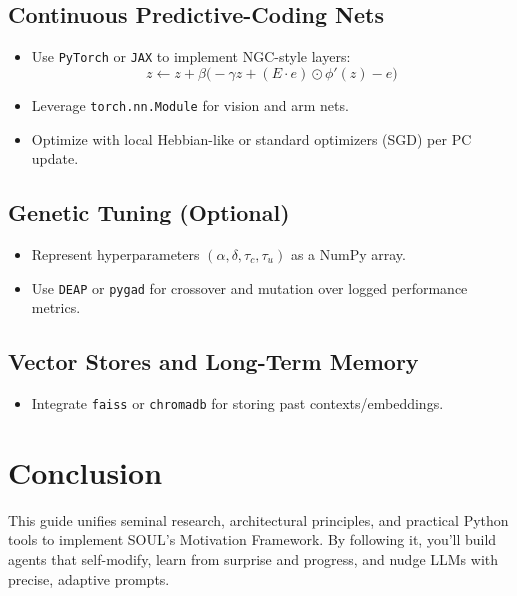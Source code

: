 \documentclass[11pt]{article}
\begin{document}
\subsection{Continuous Predictive-Coding Nets}
\begin{itemize}
  \item Use \texttt{PyTorch} or \texttt{JAX} to implement NGC-style layers:
  \[
    z \leftarrow z + \beta\bigl(-\gamma z + (E\cdot e)\odot \phi'(z) - e\bigr)
  \]
  \item Leverage \texttt{torch.nn.Module} for vision and arm nets.
  \item Optimize with local Hebbian-like or standard optimizers (SGD) per PC update.
\end{itemize}

\subsection{Genetic Tuning (Optional)}
\begin{itemize}
  \item Represent hyperparameters $(\alpha,\delta,\tau_c,\tau_u)$ as a NumPy array.
  \item Use \texttt{DEAP} or \texttt{pygad} for crossover and mutation over logged performance metrics.
\end{itemize}

\subsection{Vector Stores and Long-Term Memory}
\begin{itemize}
  \item Integrate \texttt{faiss} or \texttt{chromadb} for storing past contexts/embeddings.
\end{itemize}

\section{Conclusion}
This guide unifies seminal research, architectural principles, and practical Python tools to implement SOUL’s Motivation Framework. By following it, you’ll build agents that self-modify, learn from surprise and progress, and nudge LLMs with precise, adaptive prompts.
\end{document}
